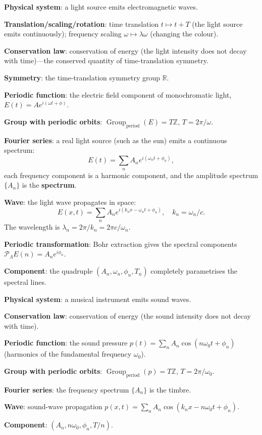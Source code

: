 \begin{example}\label{ex:light_source_modelling}
\textbf{Physical system}: a light source emits electromagnetic waves.

\textbf{Translation/scaling/rotation}: time translation $t \mapsto t+T$ (the light source emits continuously); frequency scaling $\omega \mapsto \lambda\omega$ (changing the colour).

\textbf{Conservation law}: conservation of energy (the light intensity does not decay with time)---the conserved quantity of time-translation symmetry.

\textbf{Symmetry}: the time-translation symmetry group $\mathbb{R}$.

\textbf{Periodic function}: the electric field component of monochromatic light, $E(t) = A e^{i(\omega t + \phi)}$.

\textbf{Group with periodic orbits}: $\operatorname{Group}_{\mathrm{period}}(E) = T\mathbb{Z}$, $T = 2\pi/\omega$.

\textbf{Fourier series}: a real light source (such as the sun) emits a continuous spectrum:
\[
E(t) = \sum_{n} A_n e^{i(\omega_n t + \phi_n)},
\]
each frequency component is a harmonic component, and the amplitude spectrum $\{A_n\}$ is the \textbf{spectrum}.

\textbf{Wave}: the light wave propagates in space:
\[
E(x,t) = \sum_n A_n e^{i(k_n x - \omega_n t + \phi_n)}, \quad k_n = \omega_n / c.
\]
The wavelength is $\lambda_n = 2\pi/k_n = 2\pi c/\omega_n$.

\textbf{Periodic transformation}: Bohr extraction gives the spectral components $\mathcal{P}_\Lambda E(n) = A_n e^{i\phi_n}$.

\textbf{Component}: the quadruple $(A_n, \omega_n, \phi_n, T_n)$ completely parametrises the spectral lines.
\end{example}

\begin{example}\label{ex:sound_modelling}
\textbf{Physical system}: a musical instrument emits sound waves.

\textbf{Conservation law}: conservation of energy (the sound intensity does not decay with time).

\textbf{Periodic function}: the sound pressure $p(t) = \sum_n A_n \cos(n\omega_0 t + \phi_n)$ (harmonics of the fundamental frequency $\omega_0$).

\textbf{Group with periodic orbits}: $\operatorname{Group}_{\mathrm{period}}(p) = T\mathbb{Z}$, $T = 2\pi/\omega_0$.

\textbf{Fourier series}: the frequency spectrum $\{A_n\}$ is the timbre.

\textbf{Wave}: sound-wave propagation $p(x,t) = \sum_n A_n \cos(k_n x - n\omega_0 t + \phi_n)$.

\textbf{Component}: $(A_n, n\omega_0, \phi_n, T/n)$.
\end{example}

